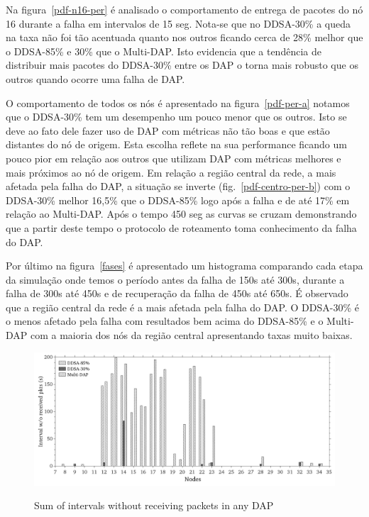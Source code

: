 \documentclass[conference]{IEEEtran}
\begin{document}
Na figura~\ref{pdf-n16-per} é analisado o comportamento de entrega de pacotes do nó 16 durante a falha em intervalos de 15 seg. Nota-se que no DDSA-30\% a queda na taxa não foi tão acentuada quanto nos outros ficando cerca de 28\% melhor que o DDSA-85\% e 30\% que o Multi-DAP. Isto evidencia que a tendência de distribuir mais pacotes do DDSA-30\% entre os DAP o torna mais robusto que os outros quando ocorre uma falha de DAP.

O comportamento de todos os nós é apresentado na figura~\ref{pdf-per-a} notamos que o DDSA-30\% tem um desempenho um pouco menor que os outros. Isto se deve ao fato dele fazer uso de DAP com métricas não tão boas e que estão distantes do nó de origem. Esta escolha reflete na sua performance ficando um pouco pior em relação aos outros que utilizam DAP com métricas melhores e mais próximos ao nó de origem. Em relação a região central da rede, a mais afetada pela falha do DAP, a situação se inverte (fig.~\ref{pdf-centro-per-b}) com o DDSA-30\% melhor 16,5\% que o DDSA-85\% logo após a falha e de até 17\% em relação ao Multi-DAP. Após o tempo 450 seg as curvas se cruzam demonstrando que a partir deste tempo o protocolo de roteamento toma conhecimento da falha do DAP.

Por último na figura~\ref{fases} é apresentado um histograma comparando cada etapa da simulação onde temos o período antes da falha de 150s até 300s, durante a falha de 300s até 450s e de recuperação da falha de 450s até 650s. É observado que a região central da rede é a mais afetada pela falha do DAP. O DDSA-30\% é o menos afetado pela falha com resultados bem acima do DDSA-85\% e o Multi-DAP com a maioria dos nós da região central apresentando taxas muito baixas.


\begin{figure}[ht]
  \centering
  \label{intv-dap}{\includegraphics[scale=.21]{IEEE-consolidados/G-wo-rcv-pkt.jpg}} 
  \caption{Sum of intervals without receiving packets in any DAP}
  \label{sum-intv}
\end{figure}
\end{document}
